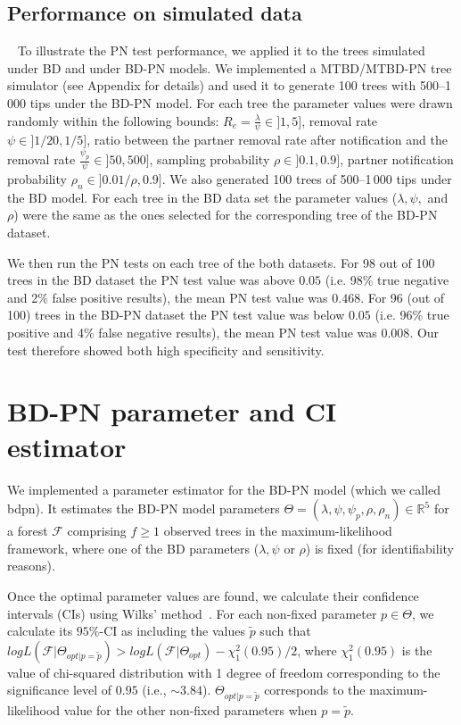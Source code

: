 \documentclass[a4paper,10pt]{article}
\begin{document}
\subsection{Performance on simulated data}~\label{sec:test:sim}
To illustrate the PN test performance, we applied it to the trees simulated under BD and under BD-PN models. We implemented a MTBD/MTBD-PN tree simulator (see Appendix for details) and used it to generate 100 trees with 500--1\,000 tips under the BD-PN model. For each tree the parameter values were drawn randomly within the following bounds:
$R_e = \frac{{\lambda}}{{\psi}} \in ]1, 5]$, 
removal rate $\psi \in ]1 / 20, 1 / 5]$,
ratio between the partner removal rate after notification and the removal rate $\frac{\psi_p}{\psi} \in ]50, 500]$,
sampling probability $\rho \in ]0.1, 0.9]$,
partner notification probability $\rho_n \in ]0.01/\rho, 0.9]$. We also generated 100 trees of 500--1\,000 tips under the BD model. For each tree in the BD data set the parameter values ($\lambda, \psi,$ and $\rho$) were the same as the ones selected for the corresponding tree of the BD-PN dataset.

We then run the PN tests on each tree of the both datasets. For 98 out of 100 trees in the BD dataset the PN test value was above $0.05$ (i.e. 98\% true negative and 2\% false positive results), the mean PN test value was $0.468$. For 96 (out of 100) trees in the BD-PN dataset the PN test value was below $0.05$ (i.e. 96\% true positive and 4\% false negative results), the mean PN test value was $0.008$.
Our test therefore showed both high specificity and sensitivity.
 

\section{BD-PN parameter and CI estimator}\label{sec:sim}
We implemented a parameter estimator for the BD-PN model (which we called bdpn). It estimates the BD-PN model parameters  $\Theta = (\lambda,\psi,\psi_p,\rho,\rho_n) \in \mathbb{R}^5$ for a forest $\mathscr{F}$ comprising $f \geq 1$ observed trees in the maximum-likelihood framework, where one of the BD parameters ($\lambda,\psi$ or $\rho$) is fixed (for identifiability reasons). 

Once the optimal parameter values are found, we calculate their confidence intervals (CIs) using Wilks' method~\citep{Wilks1938}.
For each non-fixed parameter $p \in \Theta$, we calculate its $95\%$-CI as including the values $\tilde{p}$ such that $log L(\mathscr{F}|\Theta_{opt|p=\tilde{p}}) > log L(\mathscr{F}| \Theta_{opt}) - \chi^2_1(0.95) / 2$, where $\chi^2_1(0.95)$ is the value of chi-squared distribution with 1 degree of freedom corresponding to the significance level of $0.95$ (i.e., $\sim3.84$). $\Theta_{opt|p=\tilde{p}}$ corresponds to the maximum-likelihood value for the other non-fixed parameters when $p = \tilde{p}$. 
\end{document}
